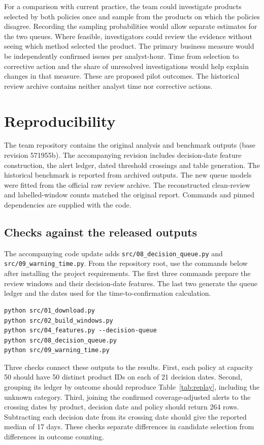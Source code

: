 \documentclass[conference]{IEEEtran}
\begin{document}
For a comparison with current practice, the team could investigate products selected by both policies once and sample from the products on which the policies disagree. Recording the sampling probabilities would allow separate estimates for the two queues. Where feasible, investigators could review the evidence without seeing which method selected the product. The primary business measure would be independently confirmed issues per analyst-hour. Time from selection to corrective action and the share of unresolved investigations would help explain changes in that measure. These are proposed pilot outcomes. The historical review archive contains neither analyst time nor corrective actions.

\section{Reproducibility}
The team repository \cite{repo} contains the original analysis and benchmark outputs (base revision 571955b). The accompanying revision includes decision-date feature construction, the alert ledger, dated threshold crossings and table generation. The historical benchmark is reported from archived outputs. The new queue models were fitted from the official raw review archive. The reconstructed clean-review and labelled-window counts matched the original report. Commands and pinned dependencies are supplied with the code.

\subsection{Checks against the released outputs}
The accompanying code update adds \texttt{src/08\_decision\_queue.py} and \texttt{src/09\_warning\_time.py}. From the repository root, use the commands below after installing the project requirements. The first three commands prepare the review windows and their decision-date features. The last two generate the queue ledger and the dates used for the time-to-confirmation calculation.

{\footnotesize
\begin{verbatim}
python src/01_download.py
python src/02_build_windows.py
python src/04_features.py --decision-queue
python src/08_decision_queue.py
python src/09_warning_time.py
\end{verbatim}}

Three checks connect these outputs to the results. First, each policy at capacity 50 should have 50 distinct product IDs on each of 21 decision dates. Second, grouping its ledger by outcome should reproduce Table~\ref{tab:replay}, including the unknown category. Third, joining the confirmed coverage-adjusted alerts to the crossing dates by product, decision date and policy should return 264 rows. Subtracting each decision date from its crossing date should give the reported median of 17 days. These checks separate differences in candidate selection from differences in outcome counting.
\end{document}
